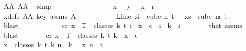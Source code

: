 \begin{isabellebody}
\ AA{}\ AA{}\ \isamarkupfalse%
\ simp\ \ \ \ \ \ \isanewline
\ \ \ \ \ \ \isamarkupfalse%
\ \isamarkupfalse%
\ {\isachardoublequoteopen}\ {\isasymchi}\ x\ {\isacharequal}{\kern0pt}\ {\isasymchi}\ y\ {\isasymand}\ {\isasymchi}\ x\ {\isacharless}{\kern0pt}\ r{\isachardoublequoteclose}\ \isanewline
\ \ \ \ \ \ \ \ \isamarkupfalse%
\ xdefs\ AA{}\ key\ assms{\isacharparenleft}{\kern0pt}{}{\isacharparenright}{\kern0pt}\ A\ \isanewline
\ \ \ \ \ \ \ \ \ \ {\isacartoucheopen}L{\isacharunderscore}{\kern0pt}line\ xi\ {\isasymin}\ cube\ n\ {\isacharparenleft}{\kern0pt}t\ {\isacharplus}{\kern0pt}\ {}{\isacharparenright}{\kern0pt}{\isacartoucheclose}\ {\isacartoucheopen}xs\ {\isasymin}\ cube\ m\ {\isacharparenleft}{\kern0pt}t\ {\isacharplus}{\kern0pt}\ {}{\isacharparenright}{\kern0pt}{\isacartoucheclose}\ \isamarkupfalse%
\ blast\isanewline
\ \ \ \ \isamarkupfalse%
\isanewline
\ \ \ \ \isamarkupfalse%
\ \isamarkupfalse%
\ {\isachardoublequoteopen}{\isasymexists}c{\isacharless}{\kern0pt}r{\isachardot}{\kern0pt}\ {\isasymforall}x\ {\isasymin}\ T\ {\isacharbackquote}{\kern0pt}\ classes\ {\isacharparenleft}{\kern0pt}k{\isacharplus}{\kern0pt}{}{\isacharparenright}{\kern0pt}\ t\ i{\isachardot}{\kern0pt}\ {\isasymchi}\ x\ {\isacharequal}{\kern0pt}\ c{\isachardoublequoteclose}\ \ {\isachardoublequoteopen}i\ {\isasymle}\ k{\isachardoublequoteclose}\ \ i\isanewline
\ \ \ \ \ \ \isamarkupfalse%
\ that\ assms{\isacharparenleft}{\kern0pt}{}{\isacharparenright}{\kern0pt}\ \isamarkupfalse%
\ blast\isanewline
\isanewline
\ \ \ \ \isamarkupfalse%
\ \isamarkupfalse%
\ {\isachardoublequoteopen}{\isasymexists}c{\isacharless}{\kern0pt}r{\isachardot}{\kern0pt}\ {\isasymforall}x\ {\isasymin}\ T\ {\isacharbackquote}{\kern0pt}\ classes\ {\isacharparenleft}{\kern0pt}k{\isacharplus}{\kern0pt}{}{\isacharparenright}{\kern0pt}\ t\ {\isacharparenleft}{\kern0pt}k{\isacharplus}{\kern0pt}{}{\isacharparenright}{\kern0pt}{\isachardot}{\kern0pt}\ {\isasymchi}\ x\ {\isacharequal}{\kern0pt}\ c{\isachardoublequoteclose}\isanewline
\ \ \ \ \isamarkupfalse%
\ {\isacharminus}{\kern0pt}\isanewline
\ \ \ \ \ \ \isamarkupfalse%
\ {\isachardoublequoteopen}{\isasymforall}x\ {\isasymin}\ classes\ {\isacharparenleft}{\kern0pt}k{\isacharplus}{\kern0pt}{}{\isacharparenright}{\kern0pt}\ t\ {\isacharparenleft}{\kern0pt}k{\isacharplus}{\kern0pt}{}{\isacharparenright}{\kern0pt}{\isachardot}{\kern0pt}\ {\isasymforall}u\ {\isacharless}{\kern0pt}\ k\ {\isacharplus}{\kern0pt}\ {}{\isachardot}{\kern0pt}\ x\ u\ {\isacharequal}{\kern0pt}\ t{\isachardoublequoteclose}\ \isamarkupfalse%

\end{isabellebody}
